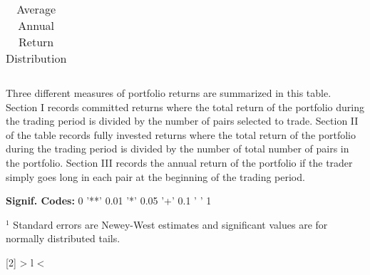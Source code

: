 \documentclass[12pt]{report}
\begin{document}
\begin{table}[hp]
\begin{tabular}{l r r l r r r r r r}
        \vspace{-1mm} \\
        \hline
    \end{tabular}
    \caption{Average Annual Return Distribution}
    \begin{tablenotes}
        \item{\footnotesize Three different measures of portfolio returns are summarized in this table. Section I records committed returns where the total return of the portfolio during the trading period is divided by the number of pairs selected to trade. Section II of the table records fully invested returns where the total return of the portfolio during the trading period is divided by the number of total number of pairs in the portfolio. Section III records the annual return of the portfolio if the trader simply goes long in each pair at the beginning of the trading period.}
        \item{\footnotesize \textbf{Signif. Codes:} 0 '**' 0.01 '*' 0.05 '+' 0.1 ' ' 1}
        \item{\footnotesize $^{1}$ Standard errors are Newey-West estimates and significant values are for normally distributed tails.} 
    \end{tablenotes}
    \label{tbl:PairsTradingReturns}
\end{table}


\newcolumntype{R}[2]{%
    >{\bgroup}%
    l%
    <{\egroup}%
}
\newcommand*\rot{\multicolumn{1}{R{30}{1em}}}%
\end{document}
